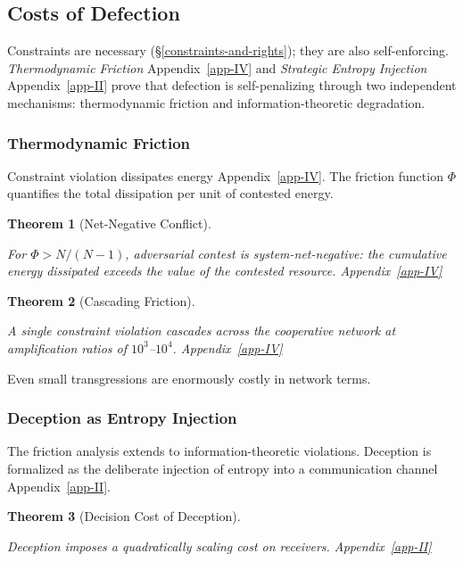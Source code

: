 \documentclass[11pt]{article}
\theoremstyle{plain}
\newtheorem{theorem}{Theorem}
\theoremstyle{definition}
\theoremstyle{remark}
\let\origsubsection\subsection
\renewcommand{\subsection}{\needspace{7\baselineskip}\origsubsection}
\let\origsubsubsection\subsubsection
\renewcommand{\subsubsection}{\needspace{4\baselineskip}\origsubsubsection}
\begin{document}
\subsection{Costs of Defection}\label{costs-of-defection}

Constraints are necessary (§\ref{constraints-and-rights}); they are also
self-enforcing. \emph{Thermodynamic Friction} Appendix~\ref{app-IV} and
\emph{Strategic Entropy Injection} Appendix~\ref{app-II} prove that
defection is self-penalizing through two independent mechanisms:
thermodynamic friction and information-theoretic degradation.

\subsubsection{Thermodynamic Friction}\label{thermodynamic-friction}

Constraint violation dissipates energy Appendix~\ref{app-IV}. The
friction function \(\Phi\) quantifies the total dissipation per unit of
contested energy.

\begin{theorem}[Net-Negative Conflict]
\label{ethics-thm-net-negative}

For $\Phi > N/(N-1)$, adversarial contest is system-net-negative: the cumulative energy dissipated exceeds the value of the contested resource. Appendix~\ref{app-IV}
\end{theorem}

\begin{theorem}[Cascading Friction]
\label{ethics-thm-cascading-friction}

A single constraint violation cascades across the cooperative network at amplification ratios of $10^3$–$10^4$. Appendix~\ref{app-IV}
\end{theorem}

Even small transgressions are enormously costly in network terms.

\subsubsection{Deception as Entropy
Injection}\label{deception-as-entropy-injection}

The friction analysis extends to information-theoretic violations.
Deception is formalized as the deliberate injection of entropy into a
communication channel Appendix~\ref{app-II}.

\begin{theorem}[Decision Cost of Deception]
\label{ethics-thm-deception-cost}

Deception imposes a quadratically scaling cost on receivers. Appendix~\ref{app-II}
\end{theorem}
\end{document}

